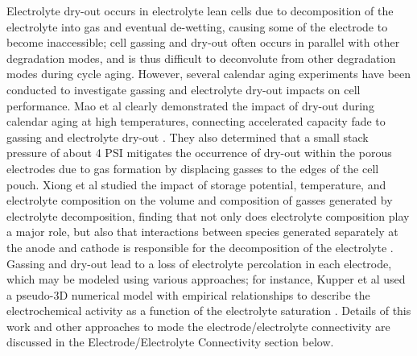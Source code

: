 \documentclass{article}
\begin{document}
Electrolyte dry-out occurs in electrolyte lean cells due to decomposition of the electrolyte into gas and eventual de-wetting, causing some of the electrode to become inaccessible; cell gassing and dry-out often occurs in parallel with other degradation modes, and is thus difficult to deconvolute from other degradation modes during cycle aging. However, several calendar aging experiments have been conducted to investigate gassing and electrolyte dry-out impacts on cell performance. Mao et al clearly demonstrated the impact of dry-out during calendar aging at high temperatures, connecting accelerated capacity fade to gassing and electrolyte dry-out \cite{mao_calendar_2017}. They also determined that a small stack pressure of about 4 PSI mitigates the occurrence of dry-out within the porous electrodes due to gas formation by displacing gasses to the edges of the cell pouch. Xiong et al studied the impact of storage potential, temperature, and electrolyte composition on the volume and composition of gasses generated by electrolyte decomposition, finding that not only does electrolyte composition play a major role, but also that interactions between species generated separately at the anode and cathode is responsible for the decomposition of the electrolyte \cite{xiong_studies_2017}. Gassing and dry-out lead to a loss of electrolyte percolation in each electrode, which may be modeled using various approaches; for instance, Kupper et al used a pseudo-3D numerical model with empirical relationships to describe the electrochemical activity as a function of the electrolyte saturation \cite{kupper_end--life_2018}. Details of this work and other approaches to mode the electrode/electrolyte connectivity are discussed in the Electrode/Electrolyte Connectivity section below.
\end{document}
